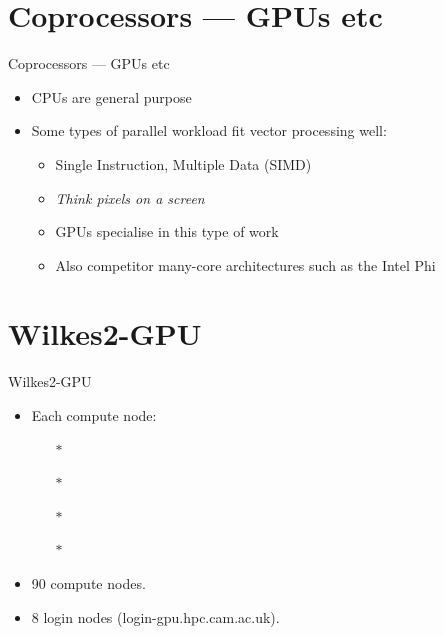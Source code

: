 \section{Coprocessors --- GPUs etc}
\begin{frame}{Coprocessors --- GPUs etc}
  \begin{itemize}
  \item{CPUs are \alert{general purpose}}
    \pause
  \item{Some types of parallel workload fit \alert{vector} processing well:}
    \begin{itemize}
    \item{Single Instruction, Multiple Data (SIMD)}
    \item{\emph{Think pixels on a screen}}\pause
    \item{GPUs specialise in this type of work}\pause
      \item{Also competitor many-core architectures such as the Intel Phi}
    \end{itemize}
\end{itemize}
\end{frame}

\section{Wilkes2-GPU}
\begin{frame}{Wilkes2-GPU}
\begin{itemize}
\item{Each compute node:}
\begin{itemize}
\item[$\ast$]{}
\item[$\ast$]{}
\item[$\ast$]{}
\item[$\ast$]{}
\end{itemize}
\item{90 compute nodes.}
\item{8 login nodes (\alert{login-gpu.hpc.cam.ac.uk}).}
\end{itemize}
\end{frame}

